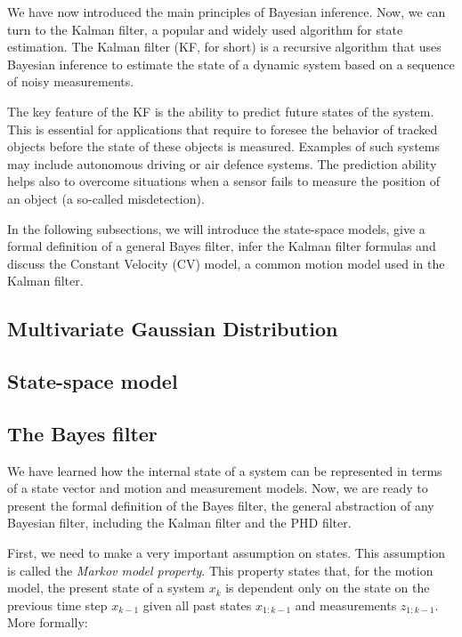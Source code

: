 We have now introduced the main principles of Bayesian inference. Now, we can
turn to the Kalman filter, a popular and widely used algorithm for state 
estimation. The Kalman filter (KF, for short) is a recursive algorithm that uses
Bayesian inference to estimate the state of a dynamic system based on a sequence
of noisy measurements.

The key feature of the KF is the ability to predict future states of the system.
This is essential for applications that require to foresee the behavior of
tracked objects before the state of these objects is measured. Examples of such
systems may include autonomous driving or air defence systems. The prediction 
ability helps also to overcome situations when a sensor fails to measure the
position of an object (a so-called misdetection).

In the following subsections, we will introduce the state-space models, give
a formal definition of a general Bayes filter, infer the Kalman filter formulas
and discuss the Constant Velocity (CV) model, a common motion model used in the
Kalman filter.

\subsection{Multivariate Gaussian Distribution}
    
\subsection{State-space model}\label{sec:state-model}
    

\subsection{The Bayes filter}\label{sec:bayes-filter}

We have learned how the internal state of a system can be represented in terms
of a state vector and motion and measurement models. Now, we are ready to 
present the formal definition of the Bayes filter, the general abstraction of
any Bayesian filter, including the Kalman filter and the PHD filter.

First, we need to make a very important assumption on states. This assumption
is called the \textit{Markov model property}. This property states that, for 
the motion model, the present state of a system $x_k$ is dependent only on 
the state on the previous time step $x_{k-1}$ given all past states $x_{1:k-1}$ 
and measurements $z_{1:k-1}$. More formally:

